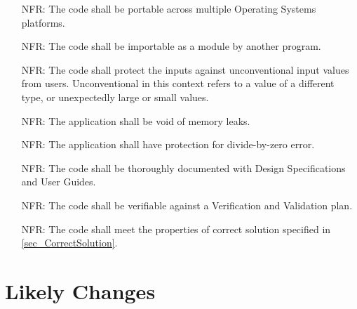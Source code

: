 \documentclass[12pt]{article}
\newcounter{reqnum} %
\newcounter{nfreqnum} %
\begin{document}
\noindent \begin{itemize}

\item[NFR\refstepcounter{nfreqnum}\thenfreqnum \label{R_Portability}:] The code
shall be portable across multiple Operating Systems platforms.

\item[NFR\refstepcounter{nfreqnum}\thenfreqnum \label{R_Usability1}:] The code
shall be importable as a module by another program. 

\item[NFR\refstepcounter{nfreqnum}\thenfreqnum \label{R_Security1}:] The code 
shall protect the inputs against unconventional input values from users. 
Unconventional in this context refers to a value of a different type, or 
unexpectedly large or small values. 

\item[NFR\refstepcounter{nfreqnum}\thenfreqnum \label{R_Security2}:] The 
application shall be void of memory leaks.

\item[NFR\refstepcounter{nfreqnum}\thenfreqnum \label{R_Security3}:] The 
application shall have protection for divide-by-zero error.

\item[NFR\refstepcounter{nfreqnum}\thenfreqnum \label{R_Maintainability}:] The 
code shall be thoroughly documented with Design Specifications and User Guides.

\item[NFR\refstepcounter{nfreqnum}\thenfreqnum \label{R_Verifiable}:] The code
shall be verifiable against a Verification and Validation plan.

\item[NFR\refstepcounter{nfreqnum}\thenfreqnum \label{R_Correctness}:] The code
shall meet the properties of correct solution specified in 
\ref{sec_CorrectSolution}.

\end{itemize}

\section{Likely Changes}    
\end{document}
